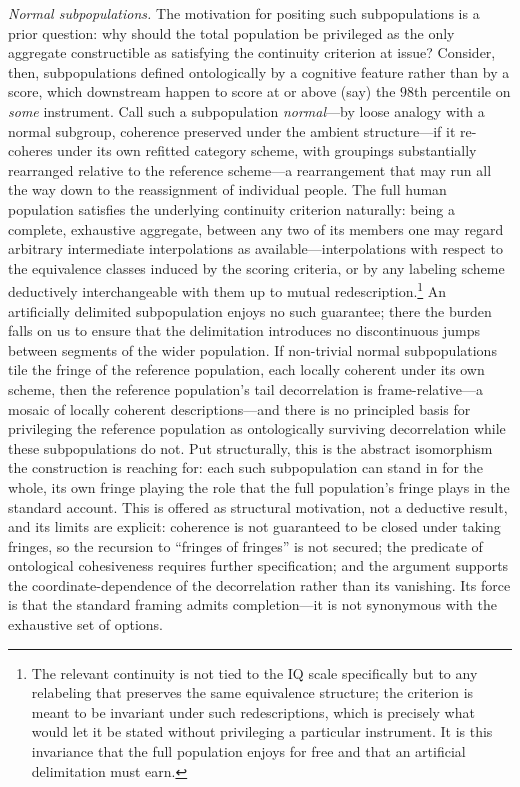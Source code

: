 \documentclass{article}
\begin{document}
\emph{Normal subpopulations.} The motivation for positing such subpopulations is a prior question: why should the total population be privileged as the only aggregate constructible as satisfying the continuity criterion at issue? Consider, then, subpopulations defined ontologically by a cognitive feature rather than by a score, which downstream happen to score at or above (say) the $98$th percentile on \emph{some} instrument. Call such a subpopulation \emph{normal}---by loose analogy with a normal subgroup, coherence preserved under the ambient structure---if it re-coheres under its own refitted category scheme, with groupings substantially rearranged relative to the reference scheme---a rearrangement that may run all the way down to the reassignment of individual people. The full human population satisfies the underlying continuity criterion naturally: being a complete, exhaustive aggregate, between any two of its members one may regard arbitrary intermediate interpolations as available---interpolations with respect to the equivalence classes induced by the scoring criteria, or by any labeling scheme deductively interchangeable with them up to mutual redescription.\footnote{The relevant continuity is not tied to the IQ scale specifically but to any relabeling that preserves the same equivalence structure; the criterion is meant to be invariant under such redescriptions, which is precisely what would let it be stated without privileging a particular instrument. It is this invariance that the full population enjoys for free and that an artificial delimitation must earn.} An artificially delimited subpopulation enjoys no such guarantee; there the burden falls on us to ensure that the delimitation introduces no discontinuous jumps between segments of the wider population. If non-trivial normal subpopulations tile the fringe of the reference population, each locally coherent under its own scheme, then the reference population's tail decorrelation is frame-relative---a mosaic of locally coherent descriptions---and there is no principled basis for privileging the reference population as ontologically surviving decorrelation while these subpopulations do not. Put structurally, this is the abstract isomorphism the construction is reaching for: each such subpopulation can stand in for the whole, its own fringe playing the role that the full population's fringe plays in the standard account. This is offered as structural motivation, not a deductive result, and its limits are explicit: coherence is not guaranteed to be closed under taking fringes, so the recursion to ``fringes of fringes'' is not secured; the predicate of ontological cohesiveness requires further specification; and the argument supports the coordinate-dependence of the decorrelation rather than its vanishing. Its force is that the standard framing admits completion---it is not synonymous with the exhaustive set of options.
\end{document}
